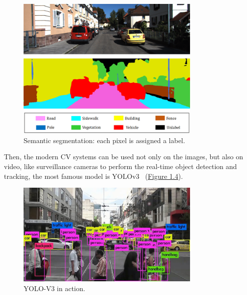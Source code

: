 \begin{figure}[H]
    \centering
    \includegraphics[width=0.8\textwidth]{images/1_1_semantic_segmentation}
    \caption[Example of semantic segmentation]{Semantic segmentation: each pixel is assigned a label.}
    \label{fig:figure-semantic-segmentation}
\end{figure}

Then, the modern CV systems can be used not only on the images, but also on video, like surveillance cameras to perform the real-time object detection and tracking, the most famous model is YOLOv3~\cite{yolov3_paper} (\hyperref[fig:figure-yolo-v3]{Figure 1.4}).

\begin{figure}[H]
    \centering
    \includegraphics[width=0.8\textwidth]{images/1_1_yolov3}
    \caption{YOLO-V3 in action.}
    \label{fig:figure-yolo-v3}
\end{figure}

